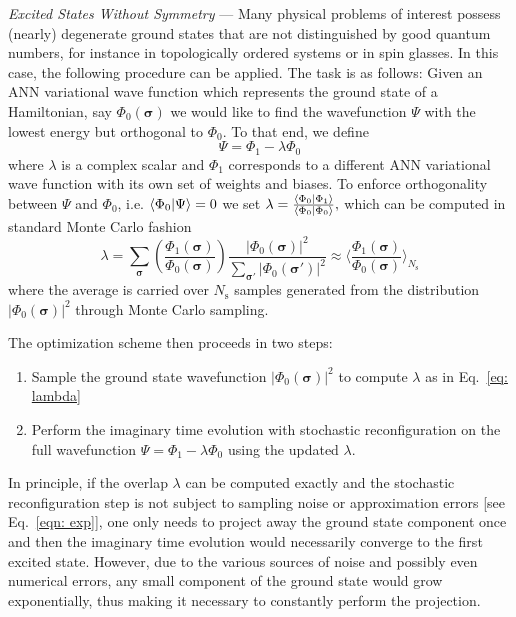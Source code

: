 \documentclass[aps,prl,twocolumn,amsmath,amssymb,superscriptaddress,floatfix]{revtex4-1}
\begin{document}
\textit{Excited States Without Symmetry} ---
Many physical problems of interest possess (nearly) degenerate ground states that are not distinguished by good quantum numbers, for instance in topologically ordered systems or in spin glasses. In this case, the following procedure can be applied. 
The task is as follows: Given an ANN variational wave function which represents the ground state of a Hamiltonian, say $\Phi_{0}(\boldsymbol{\sigma})$ we would like to find the wavefunction $\Psi$ with the lowest energy but orthogonal to $\Phi_{0}$. To that end, we define
\begin{equation} \label{eq: psi sum}
\Psi = \Phi_{1} - \lambda \Phi_{0}
\end{equation}
where $\lambda$ is a complex scalar and $\Phi_{1}$ corresponds to a different ANN variational wave function with its own set of weights and biases. To enforce orthogonality between $\Psi$ and $\Phi_{0}$, i.e. $\braket{\Phi_{0}|\Psi}=0$ we set 
$
\lambda = \frac{\braket{\Phi_{0}|\Phi_{1}}}{\braket{\Phi_{0}|\Phi_{0}}},
$
which can be computed in standard Monte Carlo fashion
\begin{equation} \label{eq: lambda}
\lambda =  \sum_{\boldsymbol{\sigma}} \left( \frac{\Phi_{1}(\boldsymbol{\sigma})}{\Phi_{0}(\boldsymbol{\sigma})} \right) \frac{|\Phi_{0}(\boldsymbol{\sigma})|^2}{\sum_{\boldsymbol{\sigma'}}|\Phi_{0}(\boldsymbol{\sigma'})|^2} \approx  \Bigg\langle \frac{\Phi_{1}(\boldsymbol{\sigma})}{\Phi_{0}(\boldsymbol{\sigma})} \Bigg\rangle_{N_{\mathrm{s}}}
\end{equation}
where the average is carried over $N_{\mathrm{s}}$ samples generated from the distribution $|\Phi_{0}(\boldsymbol{\sigma})|^2$ through  Monte Carlo sampling. 

The optimization scheme then proceeds in two steps:
\begin{enumerate}
\item Sample the ground state wavefunction $|\Phi_{0}(\boldsymbol{\sigma})|^2$ to compute $\lambda$ as in Eq.~\eqref{eq: lambda}
\item Perform the imaginary time evolution with stochastic reconfiguration \cite{Sorella2007SR} on the full wavefunction $\Psi = \Phi_{1} - \lambda \Phi_{0}$ using the updated $\lambda$.
\end{enumerate}
In principle, if the overlap $\lambda$ can be computed exactly and the stochastic reconfiguration step is not subject to sampling noise or approximation errors [see Eq.~\eqref{eqn: exp}], one only needs to project away the ground state component once and then the imaginary time evolution would necessarily converge to the first excited state. However, due to the various sources of noise and possibly even numerical errors,  any small component of the ground state would grow exponentially, thus making it necessary to constantly perform the projection.
\end{document}
